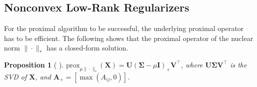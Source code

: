 \documentclass[10pt,journal,compsoc]{IEEEtran}
\newtheorem{prop}[theorem]{Proposition}
\newcommand{\X}{\mathbf{X}}
\newcommand{\NM}[2]{\| #1 \|_{#2} }
\newcommand{\Prox}[2]{\text{prox}_{#1}(#2)}
\begin{document}
%	



\subsection{Nonconvex Low-Rank Regularizers}
\label{sec:lowrankreg}

For the proximal algorithm to be successful, 
the underlying proximal operator 
has to be efficient.  
The following shows that the proximal operator  
of the 
nuclear norm $\NM{\cdot}{*}$
has a closed-form solution.

\begin{prop}[\!\!\! \cite{cai2010singular}] \label{lem:svt} 
$\Prox{\mu \NM{\cdot}{*}}{\X} 
= \mathbf{U} \left( \mathbf{\Sigma} - \mu \mathbf{I}\right)_{+} \mathbf{V}^{\top}$,
where $\mathbf{U} \mathbf{\Sigma} \mathbf{V}^{\top}$ is the SVD of $\X$, and $\mathbf{A}_{+} = [\max (A_{ij}, 0)]$. 
\end{prop}
\end{document}
